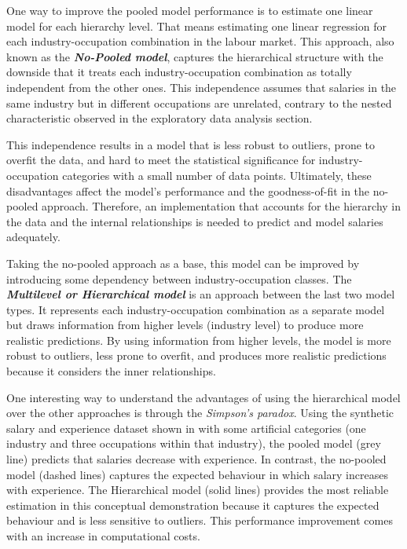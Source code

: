  One way to improve the pooled model performance is to estimate one linear model for each hierarchy level. That means estimating one linear regression for each industry-occupation combination in the labour market. This approach, also known as the \textit{\textbf{No-Pooled model}}, captures the hierarchical structure with the downside that it treats each industry-occupation combination as totally independent from the other ones. This independence assumes that salaries in the same industry but in different occupations are unrelated, contrary to the nested characteristic observed in the exploratory data analysis section. 

This independence results in a model that is less robust to outliers, prone to overfit the data, and hard to meet the statistical significance for industry-occupation categories with a small number of data points. Ultimately, these disadvantages affect the model's performance and the goodness-of-fit in the no-pooled approach. Therefore, an implementation that accounts for the hierarchy in the data and the internal relationships is needed to predict and model salaries adequately.  

Taking the no-pooled approach as a base, this model can be improved by introducing some dependency between industry-occupation classes. The \textit{\textbf{Multilevel or Hierarchical model}} is an approach between the last two model types. It represents each industry-occupation combination as a separate model but draws information from higher levels (industry level) to produce more realistic predictions. By using information from higher levels, the model is more robust to outliers, less prone to overfit, and produces more realistic predictions because it considers the inner relationships. 

One interesting way to understand the advantages of using the hierarchical model over the other approaches is through the \textit{Simpson's paradox}. Using the synthetic salary and experience dataset shown in  with some artificial categories (one industry and three occupations within that industry), the pooled model (grey line) predicts that salaries decrease with experience. In contrast, the no-pooled model (dashed lines) captures the expected behaviour in which salary increases with experience. The Hierarchical model (solid lines) provides the most reliable estimation in this conceptual demonstration because it captures the expected behaviour and is less sensitive to outliers. This performance improvement comes with an increase in computational costs. 

